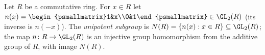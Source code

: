 Let $R$ be a commutative ring. For $x\in R$ let $n(x)=\begin{psmallmatrix}1&x\\0&1\end{psmallmatrix}\in\GL_2(R)$
(its inverse is $n(-x)$). The \emph{unipotent subgroup} is $N(R)=\{n(x):x\in R\}\subseteq\GL_2(R)$; the map
$n\colon R\to\GL_2(R)$ is an injective group homomorphism from the additive group of $R$, with image $N(R)$.
